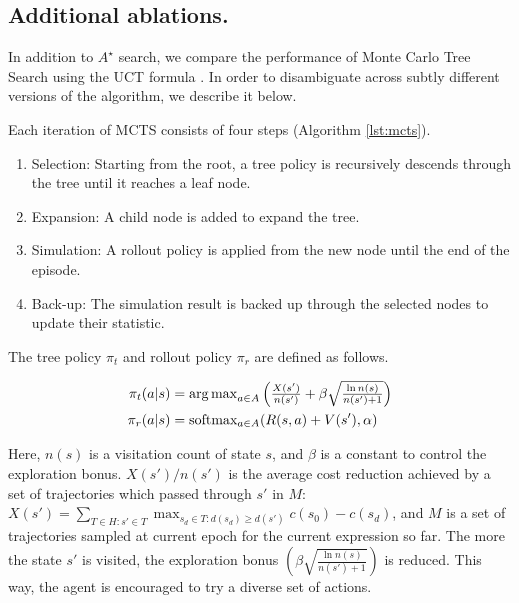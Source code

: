 \documentclass[fullpage,twocolumn]{article} %
\begin{document}
\subsection{Additional  ablations.}
\label{ablation-mcts}
In addition to $A^\star$ search, we compare the performance of Monte Carlo Tree Search \citep{browne2012survey} using the UCT formula \citep{auer2002finite,kocsis2006bandit}. In order to disambiguate across subtly different versions of the algorithm, we describe it below.

Each iteration of MCTS consists of four steps (Algorithm \ref{lst:mcts}).
\begin{enumerate}
    \item Selection: Starting from the root, a tree policy is recursively descends through the tree until it reaches a leaf node.
    \item Expansion: A child node is added to expand the tree.
    \item Simulation: A rollout policy is applied from the new node until the end of the episode.
    \item Back-up: The simulation result is backed up through the selected nodes to update their statistic.
\end{enumerate}

The tree policy $\pi_t$ and rollout policy $\pi_r$ are defined as follows.

\begin{align}
    \pi_t(a | s) &= \textstyle \operatorname*{arg\,max}_{a \in A}\left( \frac{X(s')}{n(s')} + \beta \sqrt{ \frac{\ln n(s)}{n(s') + 1}} \right) \\
    \pi_r(a | s) &= \text{softmax}_{a \in A}( R(s, a) + V(s'), \alpha)
\end{align}

Here, $n(s)$ is a visitation count of state $s$, and $\beta$ is a constant to control the exploration bonus. $X(s') / n(s')$ is the average cost reduction achieved by a set of trajectories which passed through $s'$ in $M$: $X(s') = \sum_{T \in H : s' \in T} \max_{s_d \in T : d(s_d) \geq d(s')} c(s_0) - c(s_d)$, and $M$ is a set of trajectories sampled at current epoch for the current expression so far. The more the state $s'$ is visited, the exploration bonus $(\beta \sqrt{ \frac{\ln n(s)}{n(s') + 1}})$ is reduced. This way, the agent is encouraged to try a diverse set of actions.
\end{document}
